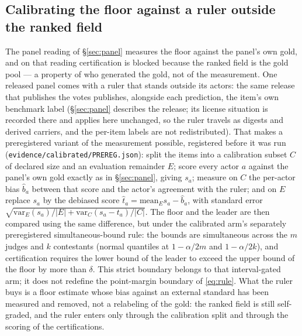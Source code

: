 \documentclass{article}
\newcommand{\ids}[1]{\texttt{\small #1}} %
\begin{document}
\subsection{Calibrating the floor against a ruler outside the ranked field}
\label{sec:calibrated}
The panel reading of \S\ref{sec:panel} measures the floor against the panel's own
gold, and on that reading certification is blocked because the ranked field is the
gold pool --- a property of who generated the gold, not of the measurement. One
released panel comes with a ruler that stands outside its actors: the same release
that publishes the votes publishes, alongside each prediction, the item's own
benchmark label (\S\ref{sec:panel} describes the release; its license situation is
recorded there and applies here unchanged, so the ruler travels as digests and
derived carriers, and the per-item labels are not redistributed). That makes a
preregistered variant of the measurement possible, registered before it was run
(\ids{evidence/calibrated/PREREG.json}): split the items into a calibration subset
$C$ of declared size and an evaluation remainder $E$; score every actor $a$ against
the panel's own gold exactly as in \S\ref{sec:panel}, giving $s_a$; measure on $C$
the per-actor bias $\hat b_a$ between that score and the actor's agreement with the
ruler; and on $E$ replace $s_a$ by the debiased score
$\hat t_a = \mathrm{mean}_E s_a - \hat b_a$, with standard error
$\sqrt{\mathrm{var}_E(s_a)/|E| + \mathrm{var}_C(s_a - t_a)/|C|}$. The floor and the
leader are then compared using the same difference, but under the calibrated arm's separately preregistered simultaneous-bound rule: the bounds are
simultaneous across the $m$ judges and $k$ contestants (normal quantiles at
$1-\alpha/2m$ and $1-\alpha/2k$), and certification requires the lower bound
of the leader to exceed the upper bound of the floor by more than $\delta$. This strict boundary belongs to that interval-gated arm; it does not redefine the point-margin boundary of \eqref{eq:rule}. What the
ruler buys is a floor estimate whose bias against an external standard has been
measured and removed, not a relabeling of the gold: the ranked field is still
self-graded, and the ruler enters only through the calibration split and through
the scoring of the certifications.
\end{document}
